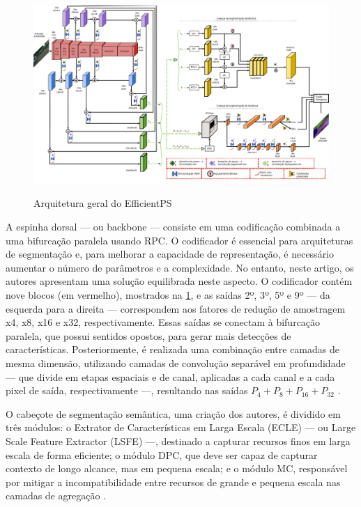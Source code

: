 \begin{figure}[ht]
	\caption{Arquitetura geral do EfficientPS}
	\centering %
	\includegraphics[width=15cm]{figures/arqEP.png} %
	\label{fig:arqEP}
\end{figure}


A espinha dorsal — ou backbone — consiste em uma codificação combinada a uma bifurcação paralela usando RPC. O codificador é essencial para arquiteturas de segmentação e, para melhorar a capacidade de representação, é necessário aumentar o número de parâmetros e a complexidade. No entanto, neste artigo, os autores apresentam uma solução equilibrada neste aspecto. O codificador contém nove blocos (em vermelho), mostrados na \cref{fig:arqEP}, e as saídas 2º, 3º, 5º e 9º — da esquerda para a direita — correspondem aos fatores de redução de amostragem x4, x8, x16 e x32, respectivamente. Essas saídas se conectam à bifurcação paralela, que possui sentidos opostos, para gerar mais detecções de características. Posteriormente, é realizada uma combinação entre camadas de mesma dimensão, utilizando camadas de convolução separável em profundidade — que divide em etapas espaciais e de canal, aplicadas a cada canal e a cada pixel de saída, respectivamente —, resultando nas saídas \( P_4 + P_8 + P_{16} + P_{32} \) \cite{mohan2020efficientps, redes-neurais-convolucionais-separaveis-em-profundidade}.


O cabeçote de segmentação semântica, uma criação dos autores, é dividido em três módulos: o Extrator de Características em Larga Escala (ECLE) — ou Large Scale Feature Extractor (LSFE) —, destinado a capturar recursos finos em larga escala de forma eficiente; o módulo DPC, que deve ser capaz de capturar contexto de longo alcance, mas em pequena escala; e o módulo MC, responsável por mitigar a incompatibilidade entre recursos de grande e pequena escala nas camadas de agregação \cite{mohan2020efficientps}.

